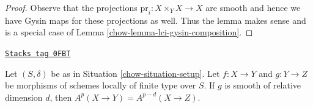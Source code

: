 \begin{proof}

Observe that the projections $\text{pr}_i : X \times_Y X \to X$ are
smooth and hence we have Gysin maps for these projections as well.
Thus the lemma makes sense and is a special case of
Lemma \ref{chow-lemma-lci-gysin-composition}.
\end{proof}

\begin{proposition}
\label{chow-proposition-compute-bivariant}
\href{https://stacks.math.columbia.edu/tag/0FBT}{\texttt{Stacks tag 0FBT}}

\begin{reference}
\cite[Proposition 17.4.2]{F}
\end{reference}
Let $(S, \delta)$ be as in Situation \ref{chow-situation-setup}.
Let $f : X \to Y$ and $g : Y \to Z$ be morphisms of schemes locally
of finite type over $S$. If $g$ is smooth of relative dimension $d$, then
$A^p(X \to Y) = A^{p - d}(X \to Z)$.
\end{proposition}

